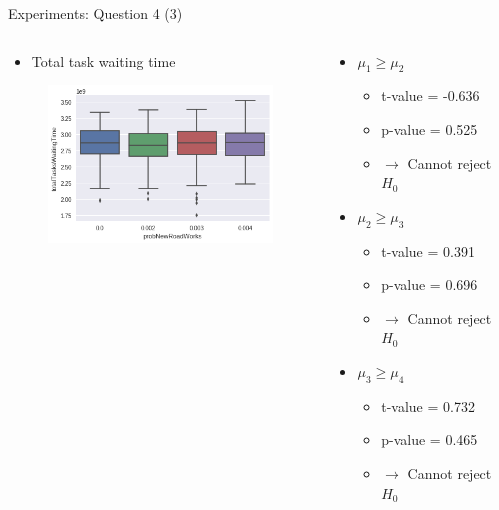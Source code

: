 \begin{frame}{Experiments: Question 4 (3)}
    \begin{columns}

        \begin{column}{0.5\textwidth}
            \begin{itemize}
                \item Total task waiting time
            \end{itemize}

            \begin{figure}[hbt]
                \includegraphics[width=6cm]{img/question4-plot3}
            \end{figure}
        \end{column}

        \begin{column}{0.5\textwidth}
            \begin{itemize}
                \item $\mu_1 \geq \mu_2$
                    \begin{itemize}
                        \item t-value = -0.636
                        \item p-value = 0.525
                        \item $\rightarrow$ Cannot reject $H_0$
                    \end{itemize}

                \item $\mu_2 \geq \mu_3$
                    \begin{itemize}
                        \item t-value = 0.391
                        \item p-value = 0.696
                        \item $\rightarrow$ Cannot reject $H_0$
                    \end{itemize}

                \item $\mu_3 \geq \mu_4$
                    \begin{itemize}
                        \item t-value = 0.732
                        \item p-value = 0.465
                        \item $\rightarrow$ Cannot reject $H_0$
                    \end{itemize}
            \end{itemize}
        \end{column}

    \end{columns}
\end{frame}

